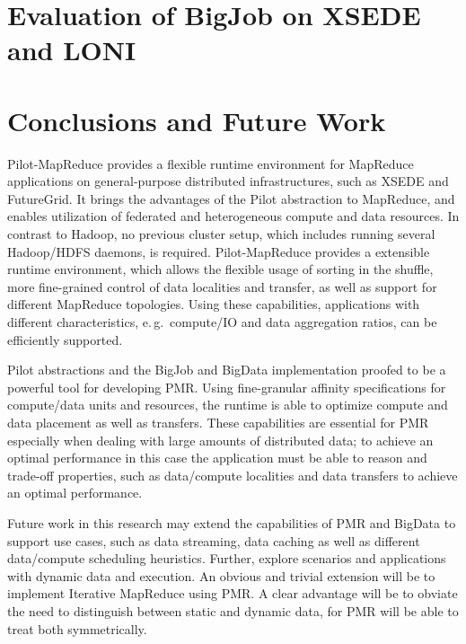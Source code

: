 \documentclass[12pt]{report}
\newcommand{\upp}{\vspace*{-0.5em}}
\newcommand{\pilotmapreduce}{Pilot-MapReduce\xspace}
\begin{document}
\chapter{Evaluation of BigJob on XSEDE and LONI}
\label{chap:pilot-lasigma}


\chapter{Conclusions and Future Work}
\label{chap:conclusions}

\pilotmapreduce provides a flexible runtime environment for MapReduce
applications on general-purpose distributed infrastructures, such as XSEDE and
FutureGrid. It brings the advantages of the Pilot abstraction to MapReduce, and
enables utilization of federated and heterogeneous compute and data resources.
In contrast to Hadoop, no previous cluster setup, which includes running several
Hadoop/HDFS daemons, is required. Pilot-MapReduce provides a extensible runtime
environment, which allows the flexible usage of sorting in the shuffle, more
fine-grained control of data localities and transfer, as well as support for
different MapReduce topologies. Using these capabilities, applications with
different characteristics, e.\,g.\ compute/IO and data aggregation ratios, can
be efficiently supported. 

Pilot abstractions and the BigJob and BigData implementation
proofed to be a powerful tool for developing PMR. Using fine-granular affinity
specifications for compute/data units and resources, the runtime is able to
optimize compute and data placement as well as transfers. These capabilities are
essential for PMR especially when dealing with large amounts of distributed
data; to achieve an optimal performance in this case the application must be
able to reason and trade-off properties, such as data/compute localities and 
data transfers to achieve an optimal performance.

Future work in this research  may extend the capabilities of PMR and BigData to support use
cases, such as data streaming, data caching as well as different data/compute
scheduling heuristics. Further, explore scenarios and applications with
dynamic data and execution. An obvious and trivial extension will be to
implement Iterative MapReduce using PMR. A clear advantage will be to obviate
the need to distinguish between static and dynamic data, for PMR will be able to
treat both symmetrically.
\upp
\end{document}
